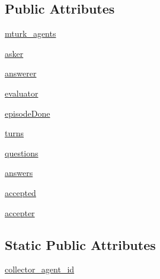 \subsection*{Public Attributes}
\begin{DoxyCompactItemize}
\item 
\hyperlink{classparlai_1_1mturk_1_1tasks_1_1react__task__demo_1_1react__custom__with__deps_1_1worlds_1_1MultiRoleAgentWorld_a7002aa66f0f3f44216b0676aa39e718a}{mturk\+\_\+agents}
\item 
\hyperlink{classparlai_1_1mturk_1_1tasks_1_1react__task__demo_1_1react__custom__with__deps_1_1worlds_1_1MultiRoleAgentWorld_aced91ea6e755e72e83e8b5f6987efa7b}{asker}
\item 
\hyperlink{classparlai_1_1mturk_1_1tasks_1_1react__task__demo_1_1react__custom__with__deps_1_1worlds_1_1MultiRoleAgentWorld_a72edb7a3795e8e646eaa45f87aca77d6}{answerer}
\item 
\hyperlink{classparlai_1_1mturk_1_1tasks_1_1react__task__demo_1_1react__custom__with__deps_1_1worlds_1_1MultiRoleAgentWorld_ad48ce0c304d7445a42b1f95b0d2b0dde}{evaluator}
\item 
\hyperlink{classparlai_1_1mturk_1_1tasks_1_1react__task__demo_1_1react__custom__with__deps_1_1worlds_1_1MultiRoleAgentWorld_a5ad6e8f22cbfd4af8a854c4a3ca48551}{episode\+Done}
\item 
\hyperlink{classparlai_1_1mturk_1_1tasks_1_1react__task__demo_1_1react__custom__with__deps_1_1worlds_1_1MultiRoleAgentWorld_a4012bcc1437d05959acf9c989696165c}{turns}
\item 
\hyperlink{classparlai_1_1mturk_1_1tasks_1_1react__task__demo_1_1react__custom__with__deps_1_1worlds_1_1MultiRoleAgentWorld_ae622ff90f3031fbadc928e36a70ed786}{questions}
\item 
\hyperlink{classparlai_1_1mturk_1_1tasks_1_1react__task__demo_1_1react__custom__with__deps_1_1worlds_1_1MultiRoleAgentWorld_a2d6cc55daebc10a0d11fcc3b9b60c305}{answers}
\item 
\hyperlink{classparlai_1_1mturk_1_1tasks_1_1react__task__demo_1_1react__custom__with__deps_1_1worlds_1_1MultiRoleAgentWorld_a98a36ba8ce62c0046d6ad89949babb38}{accepted}
\item 
\hyperlink{classparlai_1_1mturk_1_1tasks_1_1react__task__demo_1_1react__custom__with__deps_1_1worlds_1_1MultiRoleAgentWorld_ade7e3d7e47e8989cfe54c5534b3b5e4a}{accepter}
\end{DoxyCompactItemize}
\subsection*{Static Public Attributes}
\begin{DoxyCompactItemize}
\item 
\hyperlink{classparlai_1_1mturk_1_1tasks_1_1react__task__demo_1_1react__custom__with__deps_1_1worlds_1_1MultiRoleAgentWorld_a92420382cac06ccdbb6c0d2d55b457df}{collector\+\_\+agent\+\_\+id}
\end{DoxyCompactItemize}


